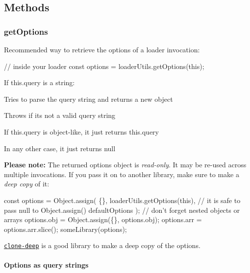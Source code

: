 \subsection*{Methods}

\subsubsection*{{\ttfamily get\+Options}}

Recommended way to retrieve the options of a loader invocation\+:


\begin{DoxyCode}
// inside your loader
const options = loaderUtils.getOptions(this);
\end{DoxyCode}



\begin{DoxyEnumerate}
\item If {\ttfamily this.\+query} is a string\+:
\begin{DoxyItemize}
\item Tries to parse the query string and returns a new object
\item Throws if it\textquotesingle{}s not a valid query string
\end{DoxyItemize}
\item If {\ttfamily this.\+query} is object-\/like, it just returns {\ttfamily this.\+query}
\item In any other case, it just returns {\ttfamily null}
\end{DoxyEnumerate}

{\bfseries Please note\+:} The returned {\ttfamily options} object is {\itshape read-\/only}. It may be re-\/used across multiple invocations. If you pass it on to another library, make sure to make a {\itshape deep copy} of it\+:


\begin{DoxyCode}
const options = Object.assign(
    \{\},
    loaderUtils.getOptions(this), // it is safe to pass null to Object.assign()
    defaultOptions
);
// don't forget nested objects or arrays
options.obj = Object.assign(\{\}, options.obj); 
options.arr = options.arr.slice();
someLibrary(options);
\end{DoxyCode}


\href{https://www.npmjs.com/package/clone-deep}{\tt clone-\/deep} is a good library to make a deep copy of the options.

\paragraph*{Options as query strings}

